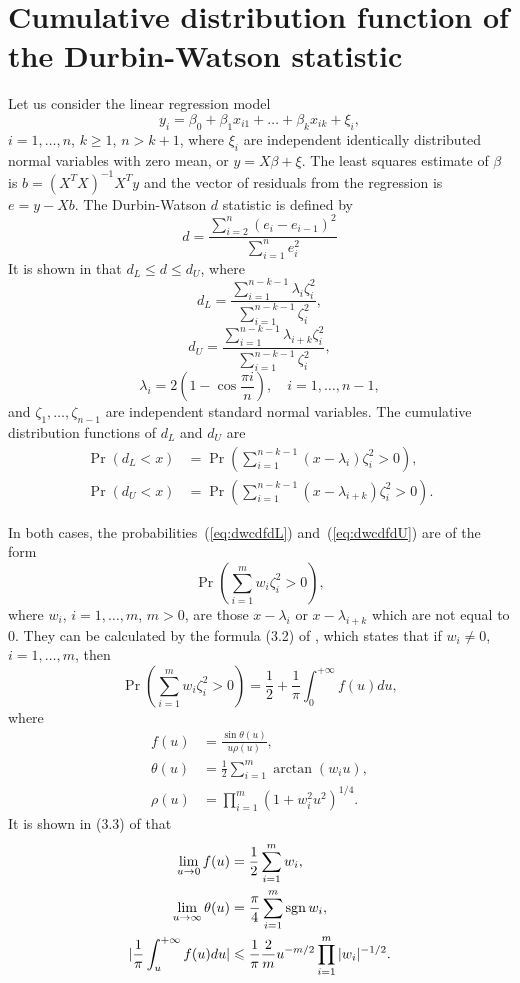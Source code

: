 \chapter{Cumulative distribution function of the Durbin-Watson statistic}

Let us consider the linear regression model \[ y_i = \beta_0 +
\beta_1x_{i1} + \ldots + \beta_kx_{ik} + \xi_i, \] $i = 1, \ldots, n$,
$k \geq 1$, $n > k + 1$, where $\xi_i$ are independent identically
distributed normal variables with zero mean, or $y = X\beta + \xi$. The
least squares estimate of $\beta$ is $b = (X^TX)^{-1}X^Ty$ and the
vector of residuals from the regression is $e = y - Xb$. The
Durbin-Watson $d$ statistic is defined by \[ d = \frac{\sum_{i = 2}^n
  (e_i - e_{i - 1})^2}{\sum_{i = 1}^n e_i^2} \] It is shown in
\cite[p.~426]{durbin-watson-1950} that $d_L \leq d \leq d_U$, where \[
d_L = \frac{\sum_{i = 1}^{n - k - 1} \lambda_i \zeta_i^2} {\sum_{i =
    1}^{n - k - 1} \zeta_i^2}, \] \[ d_U = \frac{\sum_{i = 1}^{n - k -
    1} \lambda_{i + k} \zeta_i^2} {\sum_{i = 1}^{n - k - 1}
  \zeta_i^2}, \] \[ \lambda_i = 2\left(1 - \cos \frac{\pi i}{n}\right),
\quad i = 1, \ldots, n - 1, \] and $\zeta_1, \ldots, \zeta_{n - 1}$ are
independent standard normal variables. The cumulative distribution
functions of $d_L$ and $d_U$ are
\begin{align} \label{eq:dwcdfdL}
  \Pr(d_L < x) &= \Pr\left(\sum_{i = 1}^{n - k - 1} (x - \lambda_i)
  \zeta_i^2 > 0 \right), \\
  \label{eq:dwcdfdU}
  \Pr(d_U < x) &= \Pr\left(\sum_{i = 1}^{n - k - 1} (x - \lambda_{i + k})
  \zeta_i^2 > 0 \right).
\end{align}

In both cases, the probabilities~(\ref{eq:dwcdfdL})
and~(\ref{eq:dwcdfdU}) are of the form \[ \Pr\left(\sum_{i = 1}^m w_i
\zeta_i^2 > 0 \right), \] where $w_i$, $i = 1, \ldots, m$, $m > 0$, are
those $x - \lambda_i$ or $x - \lambda_{i + k}$ which are not equal to 0.
They can be calculated by the formula (3.2) of
\cite[p.~422]{imhof-1961}, which states that if $w_i \neq 0$, $i = 1,
\ldots, m$, then \[ \Pr\left(\sum_{i = 1}^m w_i \zeta_i^2 > 0 \right) =
\frac{1}{2} + \frac{1}{\pi} \int_0^{+\infty} f(u) du, \] where
\begin{align*}
  f(u) &= \frac{\sin \theta(u)}{u \rho(u)}, \\
  \theta(u) &= \frac{1}{2} \sum_{i = 1}^m \arctan(w_iu), \\
  \rho(u) &= \prod_{i = 1}^m (1 + w_i^2u^2)^{1 / 4}.
\end{align*}
It is shown in (3.3) of \cite[p.~423]{imhof-1961} that
\begin{align}
  \nonumber
  \lim_{u \rightarrow 0} f(u) &= \frac{1}{2} \sum_{i = 1}^m w_i, \\
  \nonumber
  \lim_{u \rightarrow \infty} \theta(u) &= \frac{\pi}{4}
  \sum_{i = 1}^m \operatorname*{sgn} w_i, \\
  \label{eq:dwcdftail}
  |\frac{1}{\pi} \int_u^{+\infty} f(u) du| & \leqslant
  \frac{1}{\pi} \frac{2}{m} u^{-m / 2} \prod_{i = 1}^m |w_i|^{-1 / 2}.
\end{align}

